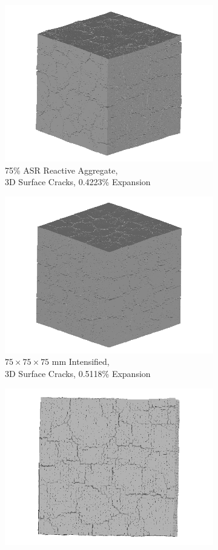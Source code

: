 \clearpage

\begin{figure}[ht]
\centering

    \begin{subfigure}{.5\textwidth}
      \centering
      \includegraphics[width=.8\linewidth]{Files/exp_3D/ASR/A30P75_3_3d.png}
      \caption{75\% ASR Reactive Aggregate, \\3D Surface Cracks, 0.4223\% Expansion}
    \end{subfigure}%
    \begin{subfigure}{.5\textwidth}
      \centering
      \includegraphics[width=.8\linewidth]{Files/exp_3D/DEF/A30X-5C_3_3d.png}
      \caption{$75 \times 75 \times 75$ mm Intensified, \\ 3D Surface Cracks, 0.5118\% Expansion}
    \end{subfigure}
    \begin{subfigure}{.5\textwidth}
      \centering
      \includegraphics[width=.8\linewidth]{Files/exp_3D/ASR/A30P75_3_3ds.png}

\end{subfigure}
\end{figure}
